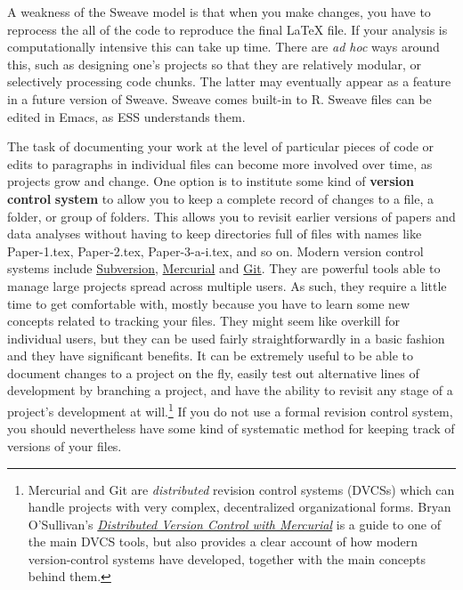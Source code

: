 \documentclass[11pt,article]{memoir}
\begin{document}
A weakness of the Sweave model is that when you make changes, you have to reprocess the all of the code to reproduce the final LaTeX file. If your analysis is computationally intensive this can take up time. There are \emph{ad hoc} ways around this, such as designing one's projects so that they are relatively modular, or selectively processing code chunks. The latter may eventually appear as a  feature in a future version of Sweave. Sweave comes built-in to R. Sweave files can be edited in Emacs, as ESS understands them.

\smallskip

The task of documenting your work at the level of particular pieces of code or edits to paragraphs in individual files can become more involved over time, as projects grow and change. One option is to institute some kind of \textbf{version} \textbf{control} \textbf{system} to allow you to keep a complete record of changes to a file, a folder, or group of folders. This allows you to revisit earlier versions of papers and data analyses without having to keep directories full of files with names like Paper-1.tex, Paper-2.tex, Paper-3-a-i.tex, and so on. Modern version control systems include \href{http://subversion.tigris.org/}{Subversion}, \href{http://www.selenic.com/mercurial/}{Mercurial} and \href{http://git.or.cz/}{Git}. They are powerful tools able to manage large projects spread across multiple users. As such, they require a little time to get comfortable with, mostly because you have to learn some new concepts related to tracking your files. They might seem like overkill for individual users, but they can be used fairly straightforwardly in a basic fashion and they have significant benefits. It can be extremely useful to be able to document changes to a project on the fly, easily test out alternative lines of development by branching a project, and have the ability to revisit any stage of a project's development at will.\footnote{Mercurial and Git are \emph{distributed} revision control systems (DVCSs) which can handle projects with very complex, decentralized organizational forms. Bryan O'Sullivan's \href{http://hgbook.red-bean.com/hgbook.pdf}{\emph{Distributed Version Control with Mercurial}} is a guide to one of the main DVCS tools, but also provides a clear account of how modern version-control systems have developed, together with the main concepts behind them.} If you do not use a formal revision control system, you should nevertheless have some kind of systematic method for keeping track of versions of your files.
\end{document}
